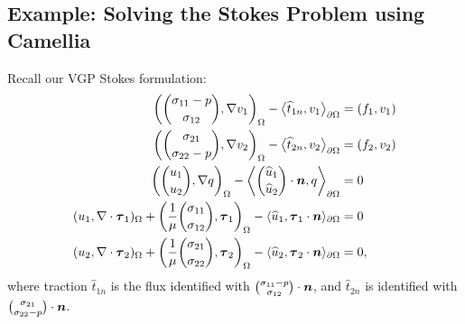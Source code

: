 
\subsection{Example: Solving the Stokes Problem using Camellia}\label{sec:stokesVGP}
Recall our VGP Stokes formulation:
\begin{align*}
\left({\sigma_{11} - p \choose \sigma_{12}}, \NVRgrad v_{1} \right)_{\Omega} - \left\langle \widehat{t}_{1n}, v_{1} \right\rangle_{\partial \Omega} &= (f_{1}, v_{1} )\\
\left({\sigma_{21} \choose \sigma_{22} - p}, \NVRgrad v_{2} \right)_{\Omega} - \left\langle \widehat{t}_{2n}, v_{2} \right\rangle_{\partial \Omega} &= (f_{2}, v_{2} )\\
\left({u_{1}  \choose u_{2}}, \NVRgrad q \right)_{\Omega} -   \left\langle {\widehat{u}_{1}  \choose \widehat{u}_{2}} \cdot \vect{n}, q \right\rangle_{\partial \Omega} &= 0\\
(u_{1}, \NVRdiv \vect{\tau}_{1})_{\Omega} + \left(\frac{1}{\mu}{\sigma_{11} \choose \sigma_{12}}, \vect{\tau}_{1}\right)_{\Omega} - \langle \widehat{u}_{1}, \vect{\tau}_{1} \cdot \vect{n} \rangle_{\partial \Omega} &= 0 \\
(u_{2}, \NVRdiv \vect{\tau}_{2})_{\Omega} + \left(\frac{1}{\mu}{\sigma_{21} \choose \sigma_{22}}, \vect{\tau}_{2}\right)_{\Omega} - \langle \widehat{u}_{2}, \vect{\tau}_{2} \cdot \vect{n} \rangle_{\partial \Omega} &= 0, \\
\end{align*}
where traction $\widehat{t}_{1n}$ is the flux identified with ${\sigma_{11} - p \choose \sigma_{12}} \cdot \vect{n}$, and $\widehat{t}_{2n}$ is identified with ${\sigma_{21}  \choose \sigma_{22} - p} \cdot \vect{n}$.

